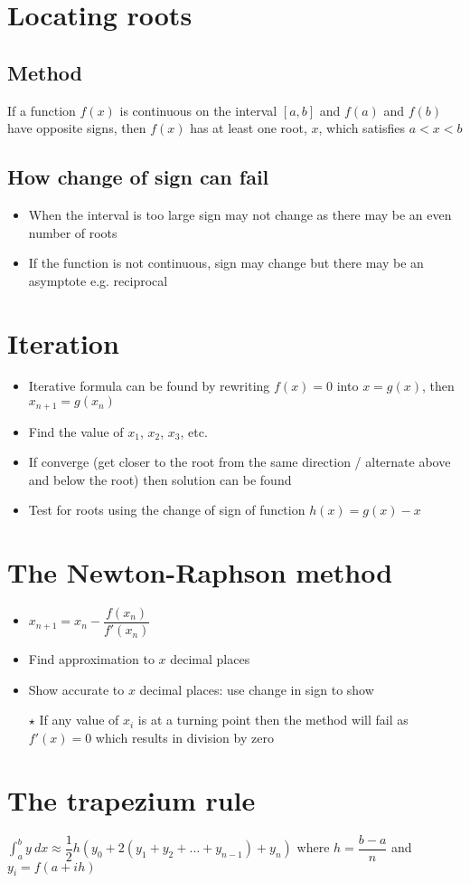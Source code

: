 \section{Locating roots}
\subsection{Method}
If a function $f(x)$ is continuous on the interval $[a,b]$ and $f(a)$ and $f(b)$ have opposite signs, then $f(x)$ has at least one root, $x$, which satisfies $a<x<b$
\subsection{How change of sign can fail}
\begin{itemize}
    \item When the interval is too large sign may not change as there may be an even number of roots
    \item If the function is not continuous, sign may change but there may be an asymptote e.g. reciprocal
\end{itemize}

\section{Iteration}
\begin{itemize}
    \item Iterative formula can be found by rewriting $f(x)=0$ into $x=g(x)$, then $x_{n+1}=g(x_n)$
    \item Find the value of $x_1$, $x_2$, $x_3$, etc.
    \item If converge (get closer to the root from the same direction / alternate above and below the root) then solution can be found
    \item Test for roots using the change of sign of function $h(x)=g(x)-x$
\end{itemize}

\section{The Newton-Raphson method}
\begin{itemize}
    \item $x_{n+1}=x_n-\dfrac{f(x_n)}{f'(x_n)}$
    \item Find approximation to $x$ decimal places
    \item Show accurate to $x$ decimal places: use change in sign to show
    \item[$\star$] If any value of $x_i$ is at a turning point then the method will fail as $f'(x)=0$ which results in division by zero
\end{itemize}

\section{The trapezium rule}
$\int_{a}^{b}y\:dx \approx \dfrac{1}{2} h (y_0+2(y_1+y_2+\dots+y_{n-1})+y_n)$ where $h=\dfrac{b-a}{n}$ and $y_i=f(a+ih)$
